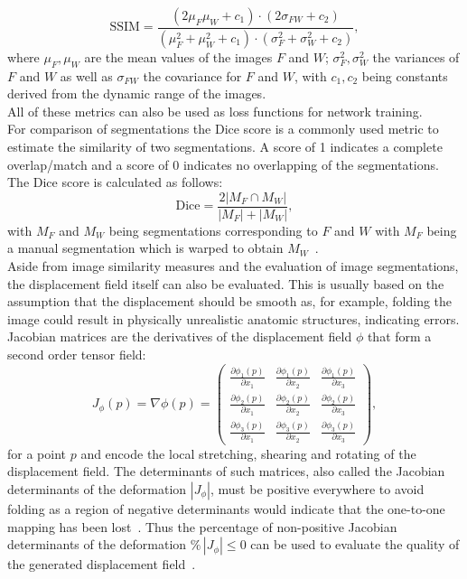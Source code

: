 \documentclass[english,version-2022-01]{uzl-thesis} %
\begin{document}
\begin{equation}
	\text{SSIM} = \frac{(2 \mu_F \mu_W + c_1) \cdot (2 \sigma_{FW} + c_2)}{(\mu_F^2 + \mu_W^2 + c_1) \cdot (\sigma_F^2 + \sigma_W^2 + c_2) },
\end{equation}
where $\mu_F, \mu_W$ are the mean values of the images $F$ and $W$; $\sigma_F^2, \sigma_W^2$ the variances of $F$ and $W$ as well as $\sigma_{FW}$ the covariance for $F$ and $W$, with $c_1, c_2$ being constants derived from the dynamic range of the images. \\
All of these metrics can also be used as loss functions for network training.\\
For comparison of segmentations the Dice score is a commonly used metric to estimate the similarity of two segmentations. A score of 1 indicates a complete overlap/match and a score of 0 indicates no overlapping of the segmentations. The Dice score is calculated as follows:
\begin{equation}
	\text{Dice} = \frac{2 |M_F \cap M_W|}{|M_F| + |M_W|},
\end{equation}
with $M_F$ and $M_W$ being segmentations corresponding to $F$ and $W$ with $M_F$ being a manual segmentation which is warped to obtain $M_W$~\cite{NiftiReg}.\\
Aside from image similarity measures and the evaluation of image segmentations, the displacement field itself can also be evaluated. This is usually based on the assumption that the displacement should be smooth as, for example, folding the image could result in physically unrealistic anatomic structures, indicating errors. Jacobian matrices are the derivatives of the displacement field $\phi$ that form a second order tensor field:
\begin{equation}
	J_{\phi}(p) = \nabla \mathbb{\phi} (p) = \begin{pmatrix}
	\frac{\partial \phi_1(p)}{\partial x_1} & \frac{\partial \phi_1(p)}{\partial x_2} & \frac{\partial \phi_1(p)}{\partial x_3} \\
	\frac{\partial \phi_2(p)}{\partial x_1} & \frac{\partial \phi_2(p)}{\partial x_2} & \frac{\partial \phi_2(p)}{\partial x_3} \\
	\frac{\partial \phi_3(p)}{\partial x_1} & \frac{\partial \phi_3(p)}{\partial x_2} & \frac{\partial \phi_3(p)}{\partial x_3} 
	\end{pmatrix},
\end{equation}
for a point $p$ and encode the local stretching, shearing and rotating of the displacement field. The determinants of such matrices, also called the Jacobian determinants of the deformation $|J_{\phi}|$, must be positive everywhere to avoid folding as a region of negative determinants would indicate that the one-to-one mapping has been lost~\cite{DARTEL}. Thus the percentage of non-positive Jacobian determinants of the deformation $\% \, |J_{\phi}|\leq0$ can be used to evaluate the quality of the generated displacement field~\cite{Chen2023}.
\end{document}
